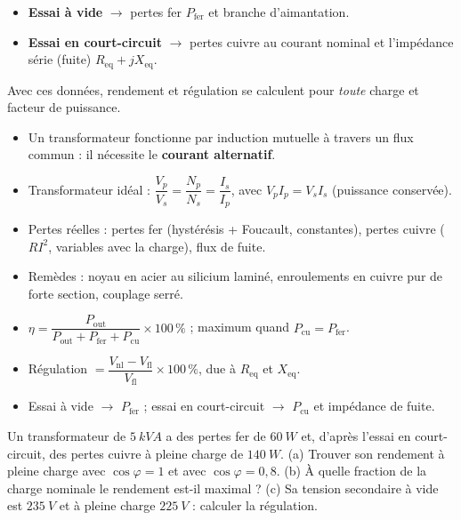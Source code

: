 \documentclass[11pt]{article}
\begin{document}
\begin{propriete}
\begin{itemize}
\item \textbf{Essai à vide} $\rightarrow$ pertes fer $P_{\mathrm{fer}}$ et branche d'aimantation.
\item \textbf{Essai en court-circuit} $\rightarrow$ pertes cuivre au courant nominal et l'impédance série (fuite) $R_{\mathrm{eq}} + jX_{\mathrm{eq}}$.
\end{itemize}
Avec ces données, rendement et régulation se calculent pour \emph{toute} charge et facteur de puissance.
\end{propriete}

\begin{aretenir}
\begin{itemize}
\item Un transformateur fonctionne par induction mutuelle à travers un flux commun : il nécessite le \textbf{courant alternatif}.
\item Transformateur idéal : $\dfrac{V_p}{V_s} = \dfrac{N_p}{N_s} = \dfrac{I_s}{I_p}$, avec $V_p I_p = V_s I_s$ (puissance conservée).
\item Pertes réelles : pertes fer (hystérésis + Foucault, constantes), pertes cuivre ($RI^{2}$, variables avec la charge), flux de fuite.
\item Remèdes : noyau en acier au silicium laminé, enroulements en cuivre pur de forte section, couplage serré.
\item $\eta = \dfrac{P_{\mathrm{out}}}{P_{\mathrm{out}} + P_{\mathrm{fer}} + P_{\mathrm{cu}}} \times 100\,\%$ ; maximum quand $P_{\mathrm{cu}} = P_{\mathrm{fer}}$.
\item Régulation $= \dfrac{V_{\mathrm{nl}} - V_{\mathrm{fl}}}{V_{\mathrm{fl}}} \times 100\,\%$, due à $R_{\mathrm{eq}}$ et $X_{\mathrm{eq}}$.
\item Essai à vide $\rightarrow$ $P_{\mathrm{fer}}$ ; essai en court-circuit $\rightarrow$ $P_{\mathrm{cu}}$ et impédance de fuite.
\end{itemize}
\end{aretenir}

\begin{exercice}
Un transformateur de $\SI{5}{kVA}$ a des pertes fer de $\SI{60}{W}$ et, d'après l'essai en court-circuit, des pertes cuivre à pleine charge de $\SI{140}{W}$. (a) Trouver son rendement à pleine charge avec $\cos\varphi = 1$ et avec $\cos\varphi = 0,8$. (b) À quelle fraction de la charge nominale le rendement est-il maximal ? (c) Sa tension secondaire à vide est $\SI{235}{V}$ et à pleine charge $\SI{225}{V}$ : calculer la régulation.
\end{exercice}
\end{document}
